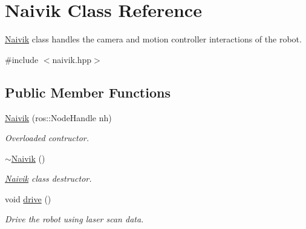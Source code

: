 \hypertarget{classNaivik}{}\section{Naivik Class Reference}
\label{classNaivik}


\hyperlink{classNaivik}{Naivik} class handles the camera and motion controller interactions of the robot.  




{\ttfamily \#include $<$naivik.\+hpp$>$}

\subsection*{Public Member Functions}
\begin{DoxyCompactItemize}
\item 
\hyperlink{classNaivik_a9bc6f959fa714784c3141b08bcbe94c6}{Naivik} (ros\+::\+Node\+Handle nh)
\begin{DoxyCompactList}\small\item\em Overloaded contructor. \end{DoxyCompactList}\item 
\hyperlink{classNaivik_a65ff8b4183c0d11b8ddf041f4be2a933}{$\sim$\+Naivik} ()
\begin{DoxyCompactList}\small\item\em \hyperlink{classNaivik}{Naivik} class destructor. \end{DoxyCompactList}\item 
void \hyperlink{classNaivik_ad4f77bbbbc92e263ac00156d774f7c39}{drive} ()
\begin{DoxyCompactList}\small\item\em Drive the robot using laser scan data. \end{DoxyCompactList}\end{DoxyCompactItemize}
